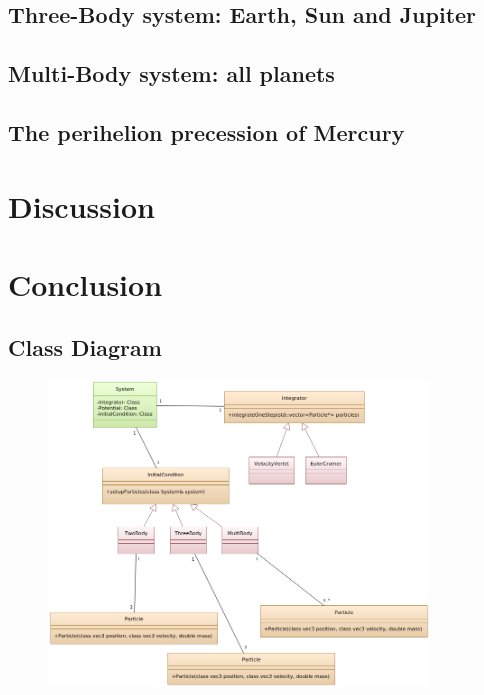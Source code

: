 \documentclass[10pt,a4paper]{amsart}
\begin{document}
\subsection{Three-Body system: Earth, Sun and Jupiter}

\subsection{Multi-Body system: all planets}

\subsection{The perihelion precession of Mercury}

\section{Discussion}


\section{Conclusion}

\pagebreak

\begin{appendix}

\section{Class Diagram}
\label{app:classdiagram}

\begin{figure}[ht]
	\centering
	\includegraphics[width=0.9\textwidth]{../figures/classdiagram.png}
\end{figure}

\end{appendix}
\end{document}
